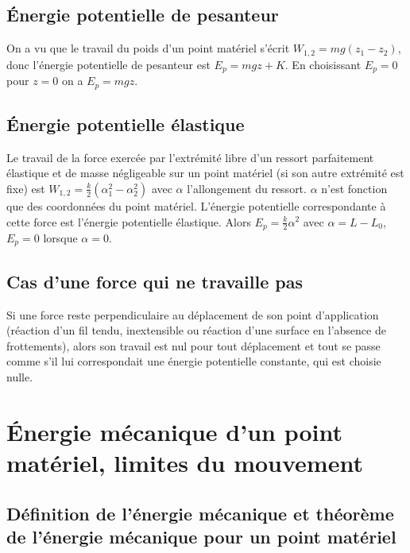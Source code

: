 \subsection{Énergie potentielle de pesanteur}
\label{chap4-subsec:NRJPotPes}

On a vu que le travail du poids d'un point matériel s'écrit $W_{1, 2}=mg(z_1-z_2)$, donc l'énergie potentielle de pesanteur est $E_p = mgz +K$. En choisissant $E_p=0$ pour $z=0$ on a $E_p=mgz$.

\subsection{Énergie potentielle élastique}
\label{chap4-subsec:NRJPotElast}

Le travail de la force exercée par l'extrémité libre d'un ressort parfaitement élastique et de masse négligeable sur un point matériel (si son autre extrémité est fixe) est $W_{1, 2} = \frac{k}{2}(\alpha_1^2-\alpha_2^2)$ avec $\alpha$ l'allongement du ressort. $\alpha$ n'est fonction que des coordonnées du point matériel. L'énergie potentielle correspondante à cette force est l'énergie potentielle élastique. Alors $E_p = \frac{k}{2}\alpha^2$ avec $\alpha=L-L_0$, $E_p=0$ lorsque $\alpha=0$.

\subsection{Cas d'une force qui ne travaille pas}
\label{chap4-subsec:casduneforcequinetravaillepas}

Si une force reste perpendiculaire au déplacement de son point d'application (réaction d'un fil tendu, inextensible ou réaction d'une surface en l'absence de frottements), alors son travail est nul pour tout déplacement et tout se passe comme s'il lui correspondait une énergie potentielle constante, qui est choisie nulle.

\section{Énergie mécanique d'un point matériel, limites du mouvement}
\label{chap4-sec:NRJmecanique}

\subsection{Définition de l'énergie mécanique et théorème de l'énergie mécanique pour un point matériel}
\label{chap4-subsec:Defdelenergiemecanique}

